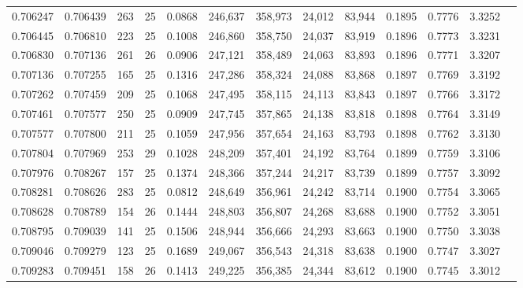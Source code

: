 \begin{tabular}{rrrrrrrrrrrrr}
0.706247 & 0.706439 &   263 &  25 &                                     0.0868 & 246,637 & 358,973 &  24,012 &  83,944 & 0.1895 & 0.7776 & 3.3252 \\
0.706445 & 0.706810 &   223 &  25 &                                     0.1008 & 246,860 & 358,750 &  24,037 &  83,919 & 0.1896 & 0.7773 & 3.3231 \\
0.706830 & 0.707136 &   261 &  26 &                                     0.0906 & 247,121 & 358,489 &  24,063 &  83,893 & 0.1896 & 0.7771 & 3.3207 \\
0.707136 & 0.707255 &   165 &  25 &                                     0.1316 & 247,286 & 358,324 &  24,088 &  83,868 & 0.1897 & 0.7769 & 3.3192 \\
0.707262 & 0.707459 &   209 &  25 &                                     0.1068 & 247,495 & 358,115 &  24,113 &  83,843 & 0.1897 & 0.7766 & 3.3172 \\
0.707461 & 0.707577 &   250 &  25 &                                     0.0909 & 247,745 & 357,865 &  24,138 &  83,818 & 0.1898 & 0.7764 & 3.3149 \\
0.707577 & 0.707800 &   211 &  25 &                                     0.1059 & 247,956 & 357,654 &  24,163 &  83,793 & 0.1898 & 0.7762 & 3.3130 \\
0.707804 & 0.707969 &   253 &  29 &                                     0.1028 & 248,209 & 357,401 &  24,192 &  83,764 & 0.1899 & 0.7759 & 3.3106 \\
0.707976 & 0.708267 &   157 &  25 &                                     0.1374 & 248,366 & 357,244 &  24,217 &  83,739 & 0.1899 & 0.7757 & 3.3092 \\
0.708281 & 0.708626 &   283 &  25 &                                     0.0812 & 248,649 & 356,961 &  24,242 &  83,714 & 0.1900 & 0.7754 & 3.3065 \\
0.708628 & 0.708789 &   154 &  26 &                                     0.1444 & 248,803 & 356,807 &  24,268 &  83,688 & 0.1900 & 0.7752 & 3.3051 \\
0.708795 & 0.709039 &   141 &  25 &                                     0.1506 & 248,944 & 356,666 &  24,293 &  83,663 & 0.1900 & 0.7750 & 3.3038 \\
0.709046 & 0.709279 &   123 &  25 &                                     0.1689 & 249,067 & 356,543 &  24,318 &  83,638 & 0.1900 & 0.7747 & 3.3027 \\
0.709283 & 0.709451 &   158 &  26 &                                     0.1413 & 249,225 & 356,385 &  24,344 &  83,612 & 0.1900 & 0.7745 & 3.3012 \\

\end{tabular}
